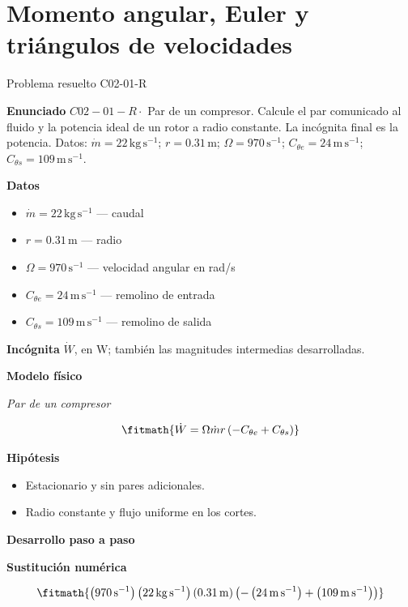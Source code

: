 \documentclass[10pt,openany]{book}
\begin{document}
\chapter{Momento angular, Euler y triángulos de velocidades}
\begin{studiumworked}{Problema resuelto C02-01-R}


\noindent\textbf{Enunciado}
\(C02-01-R \cdot\) Par de un compresor. Calcule el par comunicado al fluido y la potencia ideal de un rotor a radio constante. La incógnita final es la potencia. Datos: \(\dot m=22\, \mathrm{kg}\,\mathrm{s}^{-1}\); \(r=0.31\, \mathrm{m}\); \(\Omega=970\, \mathrm{s}^{-1}\); \(C_{\theta e}=24\, \mathrm{m}\,\mathrm{s}^{-1}\); \(C_{\theta s}=109\, \mathrm{m}\,\mathrm{s}^{-1}\).

\noindent\textbf{Datos}
\begin{itemize}
\item $\dot m = 22\,\mathrm{kg}\,\mathrm{s}^{-1}$ — caudal
\item $r = 0.31\,\mathrm{m}$ — radio
\item $\Omega = 970\,\mathrm{s}^{-1}$ — velocidad angular en rad/s
\item $C_{\theta e} = 24\,\mathrm{m}\,\mathrm{s}^{-1}$ — remolino de entrada
\item $C_{\theta s} = 109\,\mathrm{m}\,\mathrm{s}^{-1}$ — remolino de salida
\end{itemize}

\noindent\textbf{Incógnita}
$\dot{W}$, en $\mathrm{W}$; también las magnitudes intermedias desarrolladas.

\noindent\textbf{Modelo físico}

\noindent\textit{Par de un compresor}

\[
\fitmath{\dot{W}=\Omega \dot m r \left(- C_{\theta e} + C_{\theta s}\right)}
\]

\noindent\textbf{Hipótesis}
\begin{itemize}
\item Estacionario y sin pares adicionales.
\item Radio constante y flujo uniforme en los cortes.
\end{itemize}

\noindent\textbf{Desarrollo paso a paso}



\noindent\textbf{Sustitución numérica}

\[
\fitmath{\left(970\,\mathrm{s}^{-1}\right) \left(22\,\mathrm{kg}\,\mathrm{s}^{-1}\right) \left(0.31\,\mathrm{m}\right) \left(- \left(24\,\mathrm{m}\,\mathrm{s}^{-1}\right) + \left(109\,\mathrm{m}\,\mathrm{s}^{-1}\right)\right)}
\]


\end{studiumworked}
\end{document}

